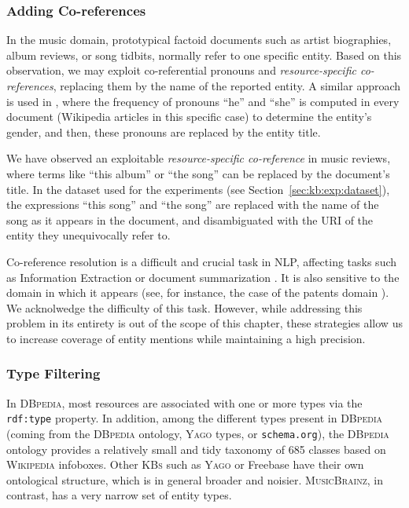 \subsubsection{Adding Co-references}

In the music domain, prototypical factoid documents such as artist biographies, album reviews, or song tidbits, normally refer to one specific entity. Based on this observation, we may exploit co-referential pronouns and \textit{resource-specific co-references}, replacing them by the name of the reported entity.
A similar approach is used in \cite{Voskarides2015}, where the frequency of pronouns ``he'' and ``she'' is computed in every document (Wikipedia articles in this specific case) to determine the entity's gender, and then, these pronouns are replaced by the entity title. %

We have observed an exploitable \textit{resource-specific co-reference} in music reviews, where terms like ``this album'' or ``the song'' can be replaced by the document's title. In the dataset used for the experiments (see Section~\ref{sec:kb:exp:dataset}), the expressions ``this song'' and ``the song'' are replaced with the name of the song as it appears in the document, and disambiguated with the URI of the entity they unequivocally refer to.

Co-reference resolution is a difficult and crucial task in NLP, affecting tasks such as Information Extraction \cite{Soon2001} or document summarization \cite{saggion2004multi}. It is also sensitive to the domain in which it appears (see, for instance, the case of the patents domain \cite{Bouayad2014}). We acknolwedge the difficulty of this task. However, while addressing this problem in its entirety is out of the scope of this chapter, these strategies allow us to increase coverage of entity mentions while maintaining a high precision.



\subsubsection{Type Filtering}
\label{sec:kb:typefiltering}

In \textsc{DBpedia}, most resources are associated with one or more types via the \texttt{rdf:type} property. In addition, among the different types present in \textsc{DBpedia} (coming from the \textsc{DBpedia} ontology, \textsc{Yago} types, or \texttt{schema.org}), the \textsc{DBpedia} ontology provides a relatively small and tidy taxonomy of 685 classes based on \textsc{Wikipedia} infoboxes. Other \textsc{KBs} such as \textsc{Yago} or Freebase have their own ontological structure, which is in general broader and noisier. \textsc{MusicBrainz}, in contrast, has a very narrow set of entity types. 

